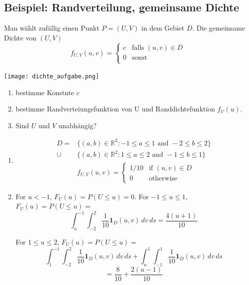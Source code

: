 \subsection{Beispiel: Randverteilung, gemeinsame Dichte}
\begin{tiny}
  Man wählt zufällig einen Punkt $P = (U, V)$ in dem Gebiet $D$. Die gemeinsame Dichte von $(U, V)$
  \[
    f_{U, V} (u, v) =
    \begin{cases}
      c & \text{falls } (u, v) \in D \\
      0 & \text{sonst}               \\
    \end{cases}
  \]
  \begin{center}
    \texttt{[image: dichte\_aufgabe.png]}
  \end{center}
  \begin{enumerate}[noitemsep,topsep=0pt,parsep=0pt,partopsep=0pt]
    \item bestimme Konstnte $c$
    \item bestimme Randverteiungsfunktion von U und Randdichtefunktion $f_U(u)$.
    \item Sind $U$ und $V$ unabhängig?
  \end{enumerate}
  \begin{enumerate}[noitemsep,topsep=0pt,parsep=0pt,partopsep=0pt]
    \item
          \begin{align*}
            D =  & \{(a, b) \in \mathbb{R}^2 : -1 \leq a \leq 1 \text{ and } -2 \leq b \leq 2\} \\
            \cup & \{(a, b) \in \mathbb{R}^2 : 1 \leq a \leq 2 \text{ and } -1 \leq b \leq 1\}  \\
                 & f_{U,V}(u, v) =
            \begin{cases}
              1/10 & \text{if } (u, v) \in D \\
              0    & \text{otherwise}
            \end{cases}
          \end{align*}
    \item For $u < -1$, $F_U(u) = P(U \leq u) = 0$.
          For $-1 \leq u \leq 1$, $F_U(u) = P(U \leq u) = $
          \[
            \int_u^{-1} \int_{-2}^{2} \frac{1}{10} \mathbf{1}_D(u, v) \, dv \, ds = \frac{4(u + 1)}{10}
          \]

          For $1 \leq u \leq 2$, $F_U(u) = P(U \leq u) =$
          \[
            \int_1^{-1} \int_{-2}^{2} \frac{1}{10} \mathbf{1}_D(u, v) \, dv \, ds + \int_u^1 \int_{-1}^{1} \frac{1}{10} \mathbf{1}_D(u, v) \, dv \, ds
          \]
          \[
            = \frac{8}{10} + \frac{2(u - 1)}{10}
          \]


\end{enumerate}
\end{tiny}
